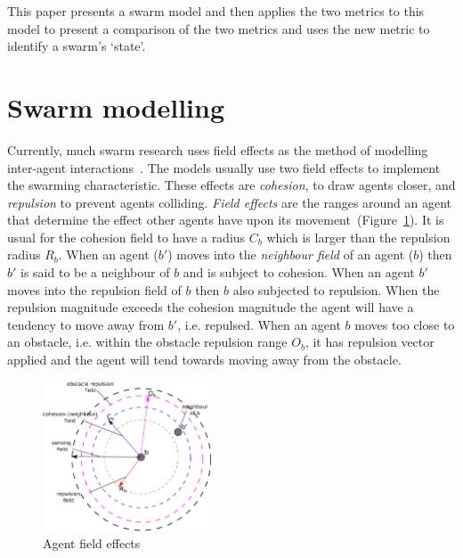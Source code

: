 \documentclass{ieeeaccess}
\begin{document}
This paper presents a swarm model and then applies the two metrics to this model to present a comparison of the two metrics and uses the new metric to identify a swarm's `state'.
 
\section{Swarm modelling}\label{SwarmModelling}
Currently, much swarm research uses field effects as the method of modelling inter-agent interactions~\cite{BAF:06, BAFVM:06, BM:09, APZDAMC:09, GP:02, GP:04, GP:04a, GP:05, GP:11, MYP:09}. The models usually use two field effects to implement the swarming characteristic. These effects are \emph{cohesion}, to draw agents closer, and \emph{repulsion} to prevent agents colliding. \emph{Field effects} are the ranges around an agent that determine the effect other agents have upon its movement~(Figure~\ref{methods:FieldEffects}). It is usual for the cohesion field to have a radius $C_b$ which is larger than the repulsion radius $R_b$. When an agent ($b'$) moves into the \emph{neighbour field} of an agent ($b$) then $b'$ is said to be a neighbour of $b$ and is subject to cohesion. When an agent $b'$ moves into the repulsion field of $b$ then $b$ also subjected to repulsion. When the repulsion magnitude exceeds the cohesion magnitude the agent will have a tendency to move away from $b'$, i.e. repulsed. When an agent $b$ moves too close to an obstacle, i.e. within the obstacle repulsion range $O_b$, it has repulsion vector applied and the agent will tend towards moving away from the obstacle.

\begin{figure}[H]
\begin{center}
\includegraphics[width=5cm]{figures/FieldEffects}
\end{center}
\caption{Agent field effects\label{methods:FieldEffects}}
\end{figure}
\end{document}
